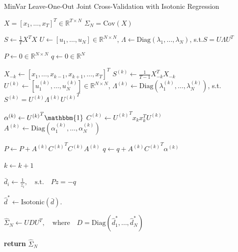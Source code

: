 \documentclass{article}
\begin{document}
\begin{algorithm}
	\caption{MinVar Leave-One-Out Joint Cross-Validation with Isotonic Regression}
	\label{alg:minvar_loo_joint_cv}
	\begin{algorithmic}[1]
	\Require $X = [x_1, \ldots, x_T]^T \in \mathbb{R}^{T\times N}$
	\Require $\Sigma_N = \mathrm{Cov}(X)$

		\State $S \gets \frac1T X^T X$
		\State 
				$U \gets [u_1, \ldots, u_N] \in \mathbb{R}^{N\times N}$,
				\quad $\Lambda \gets \mathrm{Diag}(\lambda_1, \ldots, \lambda_N)$,
				\quad \mbox{s.t.}\quad $S = U \Lambda {U}^T$

		\State $P \gets 0 \in \mathbb{R}^{N \times N}$
		\State $q \gets 0 \in \mathbb{R}^{N}$

			\State $X_{-k} \gets [x_1, \ldots, x_{k-1}, x_{k+1}, \ldots, x_T]^T$
			\State $S^{(k)} \gets \frac{1}{T-1} X_{-k}^T X_{-k} $
			\State 
				$U^{(k)} \gets [u^{(k)}_1, \ldots, u^{(k)}_N] \in \mathbb{R}^{N\times N}$,
				\quad $\Lambda^{(k)} 
					\gets \mathrm{Diag}(\lambda^{(k)}_1, \ldots, \lambda^{(k)}_N)$,
				\quad \mbox{s.t.}\quad $S^{(k)} = U^{(k)} \Lambda^{(k)} {U^{(k)}}^T$

			\State $\alpha^{(k)} \gets {U^{(k)}}^T\mathbbm{1}$
			\State $C^{(k)} \gets {U^{(k)}}^T x_k x_k^T U^{(k)}$
			\State $A^{(k)} \gets \mathrm{Diag}(\alpha^{(k)}_1, \ldots, \alpha^{(k)}_N)$

			\State $P \gets P +  A^{(k)} {C^{(k)}}^T C^{(k)} A^{(k)}$
			\State $q \gets q + A^{(k)} {C^{(k)}}^T \alpha^{(k)}$

			\State $k \gets k+1$
		\EndWhile

		\State $\bar{d}_i \gets \frac{1}{z_i}, \quad \mbox{s.t.} \quad Pz = -q$

		\State $\hat{d}^* \gets \mathrm{Isotonic}(\bar{d}).$ 

		\State $\hat{\Sigma}_N \gets UDU^T, \quad 
			\mbox{where}\quad D = \mathrm{Diag}(\hat{d}^*_1, \ldots, \hat{d}^*_N)$

		\State \textbf{return} $\hat{\Sigma}_N$ 
	\EndProcedure
	\end{algorithmic}
\end{algorithm}
\end{document}
